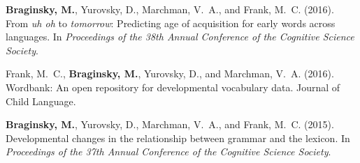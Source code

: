 \documentclass[11pt,letter]{moderncv}
\begin{document}
\begin{small}
\begin{thebibliography}{}

\textbf{Braginsky, M.}, Yurovsky, D., Marchman, V.~A., and Frank, M.~C. (2016).
\newblock From \emph{uh oh} to \emph{tomorrow}: Predicting age of acquisition for early words across languages.
\newblock In {\em Proceedings of the 38th Annual Conference of the Cognitive
  Science Society}.

Frank, M.~C., \textbf{Braginsky, M.}, Yurovsky, D., and Marchman, V.~A. (2016).
\newblock Wordbank: An open repository for developmental vocabulary data. Journal of Child Language.

\textbf{Braginsky, M.}, Yurovsky, D., Marchman, V.~A., and Frank, M.~C. (2015).
\newblock Developmental changes in the relationship between grammar and the
  lexicon.
\newblock In {\em Proceedings of the 37th Annual Conference of the Cognitive
  Science Society}.

\end{thebibliography}
\end{small}

\renewcommand{\refname}{Posters and Talks}
\end{document}
